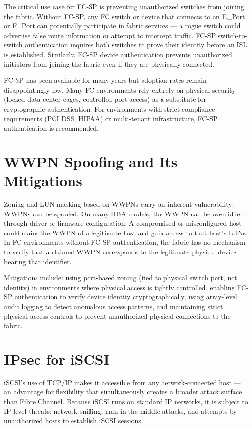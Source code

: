 The critical use case for FC-SP is preventing unauthorized switches from joining the fabric. Without FC-SP, any FC switch or device that connects to an E\_Port or F\_Port can potentially participate in fabric services --- a rogue switch could advertise false route information or attempt to intercept traffic. FC-SP switch-to-switch authentication requires both switches to prove their identity before an ISL is established. Similarly, FC-SP device authentication prevents unauthorized initiators from joining the fabric even if they are physically connected.

FC-SP has been available for many years but adoption rates remain disappointingly low. Many FC environments rely entirely on physical security (locked data center cages, controlled port access) as a substitute for cryptographic authentication. For environments with strict compliance requirements (PCI DSS, HIPAA) or multi-tenant infrastructure, FC-SP authentication is recommended.

\section{WWPN Spoofing and Its Mitigations}
Zoning and LUN masking based on WWPNs carry an inherent vulnerability: WWPNs can be spoofed. On many HBA models, the WWPN can be overridden through driver or firmware configuration. A compromised or misconfigured host could claim the WWPN of a legitimate host and gain access to that host's LUNs. In FC environments without FC-SP authentication, the fabric has no mechanism to verify that a claimed WWPN corresponds to the legitimate physical device bearing that identifier.

Mitigations include: using port-based zoning (tied to physical switch port, not identity) in environments where physical access is tightly controlled, enabling FC-SP authentication to verify device identity cryptographically, using array-level audit logging to detect anomalous access patterns, and maintaining strict physical access controls to prevent unauthorized physical connections to the fabric.

\section{IPsec for iSCSI}
iSCSI's use of TCP/IP makes it accessible from any network-connected host --- an advantage for flexibility that simultaneously creates a broader attack surface than Fibre Channel. Because iSCSI runs on standard IP networks, it is subject to IP-level threats: network sniffing, man-in-the-middle attacks, and attempts by unauthorized hosts to establish iSCSI sessions.

